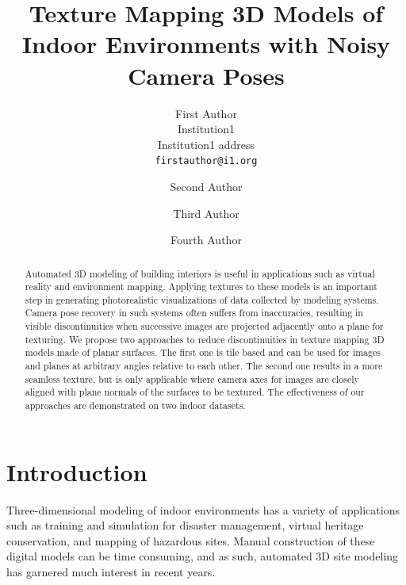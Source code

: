 \documentclass[10pt,twocolumn,letterpaper]{article}
\begin{document}
\title{Texture Mapping 3D Models of Indoor Environments with Noisy
  Camera Poses}

\author{First Author\\
  Institution1\\
  Institution1 address\\
  {\tt\small firstauthor@i1.org}
  \and
  Second Author\\
  \and
  Third Author\\
  \and
  Fourth Author\\
}
\maketitle

\begin{abstract}
  Automated 3D modeling of building interiors is useful in
  applications such as virtual reality and environment
  mapping. Applying textures to these models is an important step in
  generating photorealistic visualizations of data collected by
  modeling systems. Camera pose recovery in such systems often suffers
  from inaccuracies, resulting in visible discontinuities when
  successive images are projected adjacently onto a plane for
  texturing. We propose two approaches to reduce discontinuities in
  texture mapping 3D models made of planar surfaces. The first one is
  tile based and can be used for images and planes at arbitrary angles
  relative to each other. The second one results in a more seamless
  texture, but is only applicable where camera axes for images are
  closely aligned with plane normals of the surfaces to be
  textured. The effectiveness of our approaches are demonstrated on
  two indoor datasets.
\end{abstract}

\section{Introduction}
\label{sec:introduction}
Three-dimensional modeling of indoor environments has a variety of
applications such as training and simulation for disaster management,
virtual heritage conservation, and mapping of hazardous sites. Manual
construction of these digital models can be time consuming, and as
such, automated 3D site modeling has garnered much interest in recent
years.
\end{document}
